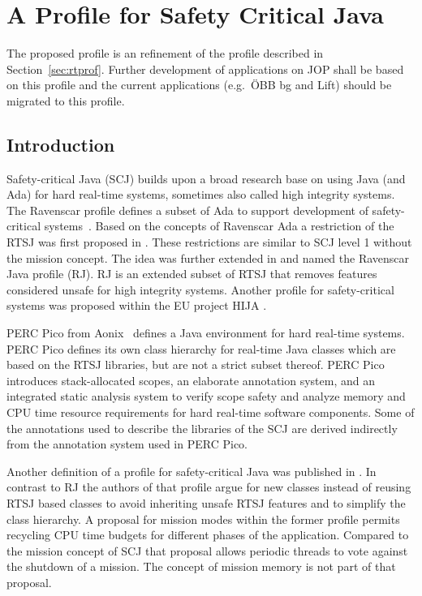 
\section{A Profile for Safety Critical Java}
\label{sec:scjava}

The proposed profile is an refinement of the profile described in
Section~\ref{sec:rtprof}. Further development of applications on JOP
shall be based on this profile and the current applications (e.g.\
\"OBB bg and Lift) should be migrated to this profile.

\subsection{Introduction}

Safety-critical Java (SCJ) builds upon a broad research base on using
Java (and Ada) for hard real-time systems, sometimes also called high
integrity systems. The Ravenscar profile defines a subset of Ada to
support development of safety-critical systems~\cite{289525}. Based
on the concepts of Ravenscar Ada a restriction of the RTSJ was first
proposed in \cite{Pusch01}. These restrictions are similar to SCJ
level 1 without the mission concept. The idea was further extended in
\cite{ravenscar:java} and named the Ravenscar Java profile (RJ). RJ
is an extended subset of RTSJ that removes features considered unsafe
for high integrity systems. Another profile for safety-critical
systems was proposed within the EU project HIJA \cite{hija}.

PERC Pico from Aonix~\cite{perc:pico:um} defines a Java environment
for hard real-time systems. PERC Pico defines its own class hierarchy
for real-time Java classes which are based on the RTSJ libraries, but
are not a strict subset thereof. PERC Pico introduces stack-allocated
scopes, an elaborate annotation system, and an integrated static
analysis system to verify scope safety and analyze memory and CPU
time resource requirements for hard real-time software components.
Some of the annotations used to describe the libraries of the SCJ are
derived indirectly from the annotation system used in PERC Pico.

Another definition of a profile for safety-critical Java was
published in \cite{jop:scjava}. In contrast to RJ the authors of that
profile argue for new classes instead of reusing RTSJ based classes
to avoid inheriting unsafe RTSJ features and to simplify the class
hierarchy. A proposal for mission modes within the former profile
\cite{jop:scjmodes} permits recycling CPU time budgets for different
phases of the application. Compared to the mission concept of SCJ
that proposal allows periodic threads to vote against the shutdown of
a mission. The concept of mission memory is not part of that
proposal.


